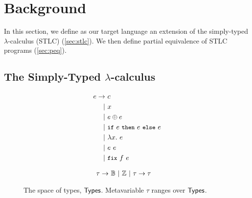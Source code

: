 \section{Background}
\label{sec:background}
%
In this section, we define as our target language an extension of the
simply-typed $\lambda$-calculus (STLC) (\autoref{sec:stlc}).
%
We then define partial equivalence of STLC programs
(\autoref{sec:peq}).

\subsection{The Simply-Typed $\lambda$-calculus}
\label{sec:stlc}
\begin{figure}[t]
  \begin{minipage}{0.48\linewidth}
    \begin{align*}
      e \rightarrow &\ c \\
      | &\ x \\
      | &\ e \oplus e \\
      | &\ \ite{ e }{ e }{ e } \\
      | &\ \lambda x.\ e \\
      | &\ e\ e \\
      | &\ \fix{ f }{ e } 
    \end{align*}
    \caption{The space of program expressions, $\expr$.
      Metavariable $e$ ranges over $\expr$, %
      $c$ ranges over $\const$, %
      $x$ ranges over $\vars$, and %
      $f$ ranges over $\fixvars$. } %
    \label{fig:exprs}
  \end{minipage}
  \begin{minipage}{0.48\linewidth}
    \begin{align*} %
      \tau \rightarrow &\ \bools\ |\ \ints\ |\ \tau \to \tau 
    \end{align*}
    \caption{The space of types, $\mathsf{Types}$.
      Metavariable $\tau$ ranges over $\mathsf{Types}$.} %
    \label{fig:types}
  \end{minipage}
\end{figure}

